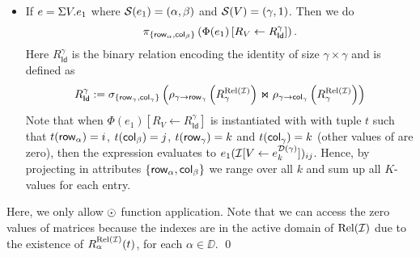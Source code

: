 \begin{itemize}
  \item If $e=\Sigma V. e_1$ where $\mathcal{S}(e_1)=(\alpha,\beta)$ and $\mathcal{S}(V)=(\gamma,1)$. Then we do 
  $$
  \pi_{\lbrace \mathsf{row}_{\alpha}, \mathsf{col}_{\beta} \rbrace}\left( \Phi (e_1)\left[ R_{V}\leftarrow R_{\mathsf{Id}}^{\gamma} \right] \right).
  $$
  Here $R_{\mathsf{Id}}^{\gamma}$ is the binary relation encoding the identity of size $\gamma\times\gamma$ and
  is defined as 
  $$
  R_{\mathsf{Id}}^{\gamma}:= \sigma_{\lbrace \mathsf{row}_{\gamma},\mathsf{col}_{\gamma} \rbrace }\left( \rho_{\gamma\rightarrow\mathsf{row}_\gamma}\left( R_\gamma^{\text{Rel}(\mathcal{I})} \right) \Join \rho_{\gamma\rightarrow\mathsf{col}_\gamma}\left( R_\gamma^{\text{Rel}(\mathcal{I})} \right)\right)
  $$
  Note that when $\Phi (e_1)\left[ R_{V}\leftarrow R_{\mathsf{Id}}^{\gamma} \right]$ is instantiated with with tuple $t$ such that $t(\mathsf{row}_\alpha)=i$, $t(\mathsf{col}_\beta)=j$, 
  $t(\mathsf{row}_\gamma)=k$ and $t(\mathsf{col}_\gamma)=k$ (other values of are zero),
  then the expression evaluates to $e_1(\mathcal{I} [V\leftarrow e_{k}^{\mathcal{D}(\gamma)}])_{ij}$. 
  Hence, by projecting in attributes $\lbrace \mathsf{row}_\alpha, \mathsf{col}_\beta\rbrace$ we range over all $k$ and sum up all $K$-values for each entry.
\end{itemize}

Here, we only allow $\odot$ function application. 
Note that we can access the zero values of matrices because the indexes are in the active domain of $\text{Rel}(\mathcal{I})$ due to the existence of $R_\alpha^{\text{Rel}(\mathcal{I})}(t)$, for each $\alpha \in \DD$.
\qed


